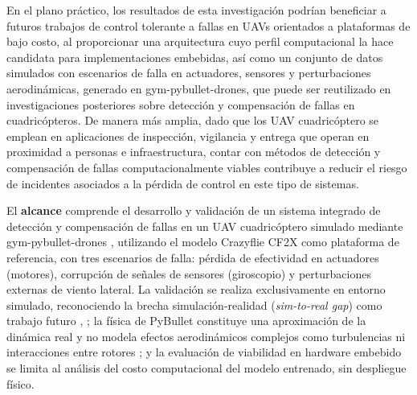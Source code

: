 \noindent En el plano práctico, los resultados de esta investigación 
podrían beneficiar a futuros trabajos de control tolerante a fallas 
en UAVs orientados a plataformas de bajo costo, al proporcionar una 
arquitectura cuyo perfil computacional la hace candidata para 
implementaciones embebidas, así como un conjunto de datos simulados 
con escenarios de falla en actuadores, sensores y perturbaciones 
aerodinámicas, generado en gym-pybullet-drones, que puede ser 
reutilizado en investigaciones posteriores sobre detección y 
compensación de fallas en cuadricópteros. De manera más amplia, dado 
que los UAV cuadricóptero se emplean en aplicaciones de inspección, 
vigilancia y entrega que operan en proximidad a personas e 
infraestructura, contar con métodos de detección y compensación de 
fallas computacionalmente viables contribuye a reducir el riesgo de 
incidentes asociados a la pérdida de control en este tipo de 
sistemas.



El \textbf{alcance}  comprende el desarrollo 
y validación de un sistema integrado de detección y compensación 
de fallas en un UAV cuadricóptero simulado mediante 
gym-pybullet-drones \cite{panerati2021}, utilizando el modelo 
Crazyflie CF2X como plataforma de referencia, con tres escenarios 
de falla: pérdida de efectividad en actuadores (motores), 
corrupción de señales de sensores (giroscopio) y perturbaciones 
externas de viento lateral. La validación se realiza 
exclusivamente en entorno simulado, reconociendo la brecha 
simulación-realidad (\textit{sim-to-real gap}) como trabajo 
futuro \cite{kim2025}, \cite{hsu2024}; la física de PyBullet 
constituye una aproximación de la dinámica real y no modela 
efectos aerodinámicos complejos como turbulencias ni interacciones 
entre rotores \cite{panerati2021}; y la evaluación de viabilidad 
en hardware embebido se limita al análisis del costo computacional 
del modelo entrenado, sin despliegue físico.